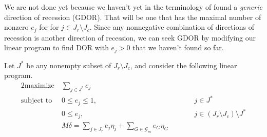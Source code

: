 We are not done yet because we haven't yet in the terminology of
\citet{geyer-gdor} found a \emph{generic} direction of recession (GDOR).
That will be one that has the maximal number of nonzero $e_j$ for
for $j \in J_r \setminus J_c$.  Since any nonnegative combination of
directions of recession is another direction of recession, we can
seek GDOR by modifying our linear program to find DOR with $e_j > 0$
that we haven't found so far.

Let $J^{*}$ be any nonempty subset of $J_r \setminus J_c$,
and consider the following linear program.
\begin{alignat}{2}
  \text{maximize}   & \ \sum_{j \in J^{*}} e_j
  \nonumber
  \\
  \text{subject to} & \ 0 \le e_j \le 1, & \qquad & j \in J^{*}
  \label{prog:foobar}
  \\
                    & \ 0 \le e_j, & \qquad &
                      j \in (J_r \setminus J_c) \setminus J^{*}
  \nonumber
  \\
                    & \ M \delta =
  \sum_{j \in J_r} e_j \eta_j + \sum_{G \in \mathcal{G}_m} e_G \eta_G
  \nonumber
\end{alignat}

